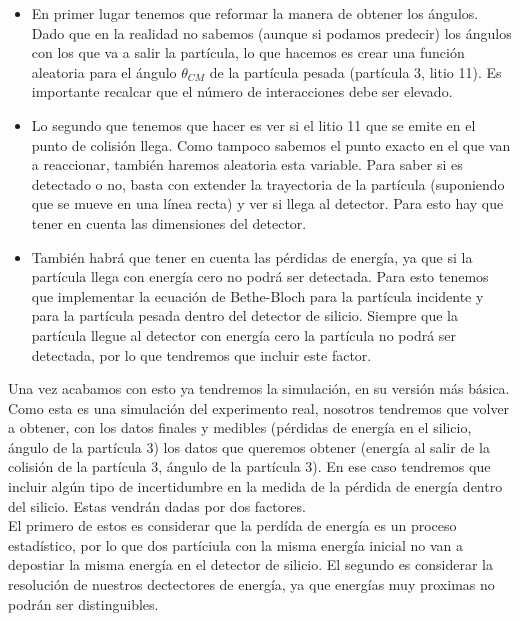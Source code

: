 \documentclass[12pt,a4paper]{article}
\numberwithin{equation}{section}
\numberwithin{figure}{section}
\begin{document}
\begin{itemize}
    \item En primer lugar tenemos que reformar la manera de obtener los ángulos. Dado que en la realidad no sabemos (aunque si podamos predecir) los ángulos con los que va a salir la partícula, lo que hacemos es crear una función aleatoria para el ángulo $\theta_{CM}$ de la partícula pesada (partícula 3, litio 11). Es importante recalcar que el número de interacciones debe ser elevado. 
    

    \item Lo segundo que tenemos que hacer es ver si el litio 11 que se emite en el punto de colisión llega. Como tampoco sabemos el punto exacto en el que van a reaccionar, también haremos aleatoria esta variable. Para saber si es detectado o no, basta con extender la trayectoria de la partícula (suponiendo que se mueve en una línea recta) y ver si llega al detector. Para esto hay que tener en cuenta las dimensiones del detector. 
    

    \item También habrá que tener en cuenta las pérdidas de energía, ya que si la partícula llega con energía cero no podrá ser detectada. Para esto tenemos que implementar la ecuación de Bethe-Bloch para la partícula incidente y para la partícula pesada dentro del detector de silicio. Siempre que la partícula llegue al detector con energía cero la partícula no podrá ser detectada, por lo que tendremos que incluir este factor. 
    

\end{itemize}

Una vez acabamos con esto ya tendremos la simulación, en su versión más básica. Como esta es una simulación del experimento real, nosotros tendremos que volver a obtener, con los datos finales y medibles (pérdidas de energía en el silicio, ángulo de la partícula 3) los datos que queremos obtener (energía al salir de la colisión de la partícula 3, ángulo de la partícula 3). En ese caso tendremos que incluir algún tipo de incertidumbre en la medida de la pérdida de energía dentro del silicio. Estas vendrán dadas por dos factores. \\

El primero de estos es considerar que la perdída de energía es un proceso estadístico, por lo que dos partíciula con la misma energía inicial no van a depostiar la misma energía en el detector de silicio. El segundo es considerar la resolución de nuestros dectectores de energía, ya que energías muy proximas no podrán ser distinguibles. 
\end{document}
